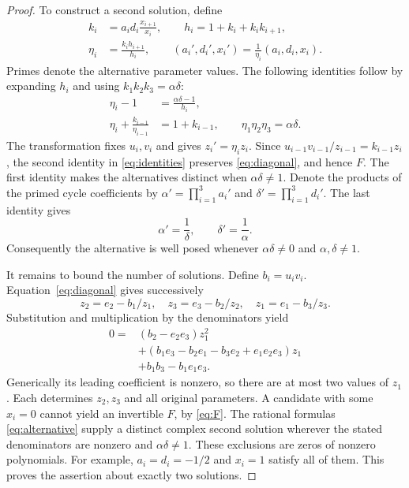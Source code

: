 \documentclass[letterpaper,10pt,conference]{ieeeconf}
\begin{document}
\begin{proof}
To construct a second solution, define
\begin{equation}\label{eq:alternative}
\begin{split}
 k_i&=a_id_i\frac{x_{i+1}}{x_i},\qquad
 h_i=1+k_i+k_ik_{i+1},\\
 \eta_i&=\frac{k_ih_{i+1}}{h_i},\qquad
 (a_i',d_i',x_i')=\frac{1}{\eta_i}(a_i,d_i,x_i).
\end{split}
\end{equation}
Primes denote the alternative parameter values. The following identities
follow by expanding \(h_i\) and using \(k_1k_2k_3=\alpha\delta\):
\begin{equation}\label{eq:identities}
\begin{split}
 \eta_i-1&=\frac{\alpha\delta-1}{h_i},\\
 \eta_i+\frac{k_{i-1}}{\eta_{i-1}}&=1+k_{i-1},
 \qquad \eta_1\eta_2\eta_3=\alpha\delta.
\end{split}
\end{equation}
The transformation fixes \(u_i,v_i\) and gives \(z_i'=\eta_i z_i\).
Since \(u_{i-1}v_{i-1}/z_{i-1}=k_{i-1}z_i\), the second identity
in \eqref{eq:identities} preserves \eqref{eq:diagonal}, and hence \(F\).
The first identity makes the alternatives distinct when
\(\alpha\delta\ne1\). Denote the products of the primed cycle
coefficients by \(\alpha'=\prod_{i=1}^3a_i'\) and
\(\delta'=\prod_{i=1}^3d_i'\). The last identity gives
\begin{equation}\label{eq:products}
 \alpha'=\frac1\delta,\qquad \delta'=\frac1\alpha.
\end{equation}
Consequently the alternative is well posed whenever
\(\alpha\delta\ne0\) and \(\alpha,\delta\ne1\).

It remains to bound the number of solutions. Define \(b_i=u_iv_i\).
Equation~\eqref{eq:diagonal} gives successively
\[
 z_2=e_2-b_1/z_1,\quad
 z_3=e_3-b_2/z_2,\quad z_1=e_1-b_3/z_3.
\]
Substitution and multiplication by the denominators yield
\begin{equation}\label{eq:quadratic}
\begin{split}
0={}&(b_2-e_2e_3)z_1^2\\
 &+(b_1e_3-b_2e_1-b_3e_2+e_1e_2e_3)z_1\\
 &+b_1b_3-b_1e_1e_3.
\end{split}
\end{equation}
Generically its leading coefficient is nonzero, so there are at most
two values of \(z_1\). Each determines \(z_2,z_3\) and all original
parameters. A candidate with some \(x_i=0\) cannot yield an
invertible \(F\), by \eqref{eq:F}.
The rational formulas \eqref{eq:alternative} supply a distinct complex
second solution wherever the stated denominators are nonzero and
\(\alpha\delta\ne1\). These exclusions are zeros of nonzero polynomials.
For example, \(a_i=d_i=-1/2\) and \(x_i=1\) satisfy all of them.
This proves the assertion about exactly two solutions.
\end{proof}
\end{document}
